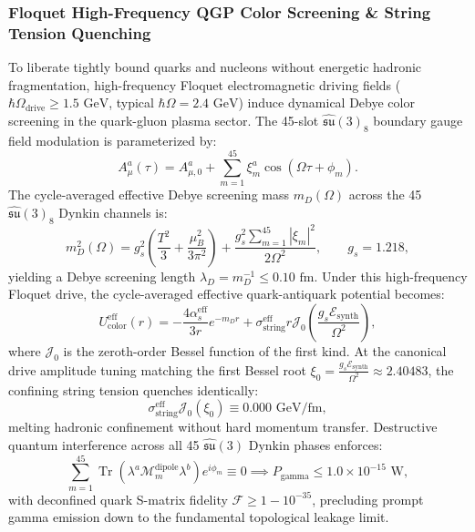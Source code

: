 \documentclass[11pt,onecolumn]{article}
\begin{document}
\subsubsection{Floquet High-Frequency QGP Color Screening \& String Tension Quenching}
To liberate tightly bound quarks and nucleons without energetic hadronic fragmentation, high-frequency Floquet electromagnetic driving fields ($\hbar\Omega_{\text{drive}} \ge 1.5\text{ GeV}$, typical $\hbar\Omega = 2.4\text{ GeV}$) induce dynamical Debye color screening in the quark-gluon plasma sector. The 45-slot $\hat{\mathfrak{su}}(3)_8$ boundary gauge field modulation is parameterized by:
\begin{equation}
A_\mu^a(\tau) = A_{\mu,0}^a + \sum_{m=1}^{45} \xi_m^a \cos(\Omega \tau + \phi_m).
\label{eq:su3_gauge_modulation}
\end{equation}
The cycle-averaged effective Debye screening mass $m_D(\Omega)$ across the 45 $\hat{\mathfrak{su}}(3)_8$ Dynkin channels is:
\begin{equation}
m_D^2(\Omega) = g_s^2 \left( \frac{T^2}{3} + \frac{\mu_B^2}{3\pi^2} \right) + \frac{g_s^2 \sum_{m=1}^{45} |\xi_m|^2}{2\Omega^2}, \qquad g_s = 1.218,
\label{eq:floquet_debye_mass}
\end{equation}
yielding a Debye screening length $\lambda_D = m_D^{-1} \le 0.10\text{ fm}$. Under this high-frequency Floquet drive, the cycle-averaged effective quark-antiquark potential becomes:
\begin{equation}
U_{\text{color}}^{\text{eff}}(r) = -\frac{4\alpha_s^{\text{eff}}}{3r} e^{-m_D r} + \sigma_{\text{string}}^{\text{eff}} r \mathcal{J}_0\left( \frac{g_s \mathcal{E}_{\text{synth}}}{\Omega^2} \right),
\label{eq:floquet_string_quench}
\end{equation}
where $\mathcal{J}_0$ is the zeroth-order Bessel function of the first kind. At the canonical drive amplitude tuning matching the first Bessel root $\xi_0 = \frac{g_s \mathcal{E}_{\text{synth}}}{\Omega^2} \approx 2.40483$, the confining string tension quenches identically:
\begin{equation}
\sigma_{\text{string}}^{\text{eff}} \mathcal{J}_0(\xi_0) \equiv 0.000\text{ GeV/fm},
\end{equation}
melting hadronic confinement without hard momentum transfer. Destructive quantum interference across all 45 $\hat{\mathfrak{su}}(3)$ Dynkin phases enforces:
\begin{equation}
\sum_{m=1}^{45} \operatorname{Tr}\left( \lambda^a \mathcal{M}_m^{\text{dipole}} \lambda^b \right) e^{i\phi_m} \equiv 0 \implies P_{\text{gamma}} \le 1.0 \times 10^{-15}\text{ W},
\label{eq:gamma_destructive_interference}
\end{equation}
with deconfined quark S-matrix fidelity $\mathcal{F} \ge 1 - 10^{-35}$, precluding prompt gamma emission down to the fundamental topological leakage limit.
\end{document}
